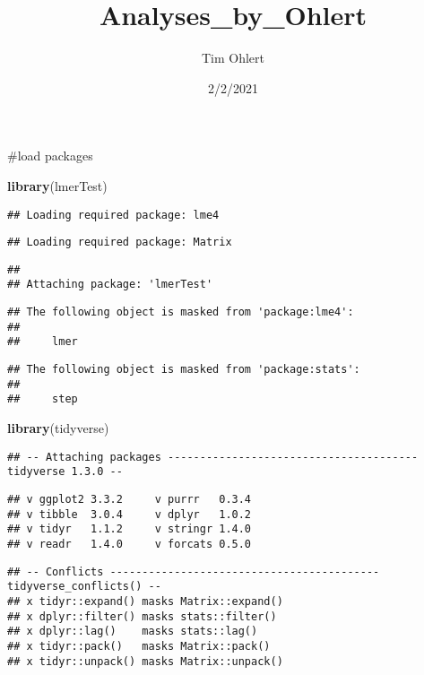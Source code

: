 \documentclass[
]{article}
\title{Analyses\_by\_Ohlert}
\author{Tim Ohlert}
\date{2/2/2021}
\newenvironment{Shaded}{\begin{snugshade}}{\end{snugshade}}
\newcommand{\KeywordTok}[1]{\textcolor[rgb]{0.13,0.29,0.53}{\textbf{#1}}}
\newcommand{\NormalTok}[1]{#1}
\begin{document}
\maketitle

\#load packages

\begin{Shaded}
\begin{Highlighting}[]
\KeywordTok{library}\NormalTok{(lmerTest)}
\end{Highlighting}
\end{Shaded}

\begin{verbatim}
## Loading required package: lme4
\end{verbatim}

\begin{verbatim}
## Loading required package: Matrix
\end{verbatim}

\begin{verbatim}
## 
## Attaching package: 'lmerTest'
\end{verbatim}

\begin{verbatim}
## The following object is masked from 'package:lme4':
## 
##     lmer
\end{verbatim}

\begin{verbatim}
## The following object is masked from 'package:stats':
## 
##     step
\end{verbatim}

\begin{Shaded}
\begin{Highlighting}[]
\KeywordTok{library}\NormalTok{(tidyverse)}
\end{Highlighting}
\end{Shaded}

\begin{verbatim}
## -- Attaching packages --------------------------------------- tidyverse 1.3.0 --
\end{verbatim}

\begin{verbatim}
## v ggplot2 3.3.2     v purrr   0.3.4
## v tibble  3.0.4     v dplyr   1.0.2
## v tidyr   1.1.2     v stringr 1.4.0
## v readr   1.4.0     v forcats 0.5.0
\end{verbatim}

\begin{verbatim}
## -- Conflicts ------------------------------------------ tidyverse_conflicts() --
## x tidyr::expand() masks Matrix::expand()
## x dplyr::filter() masks stats::filter()
## x dplyr::lag()    masks stats::lag()
## x tidyr::pack()   masks Matrix::pack()
## x tidyr::unpack() masks Matrix::unpack()
\end{verbatim}
\end{document}
